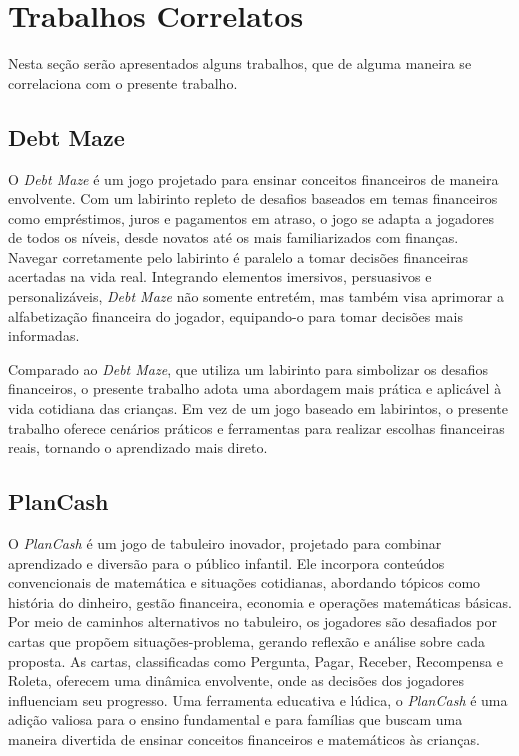     \section{Trabalhos Correlatos}
        Nesta seção serão apresentados alguns trabalhos, que de alguma maneira se correlaciona com o presente trabalho.

        \subsection{Debt Maze}
            O \textit{Debt Maze}\cite{Debt_Maze} é um jogo projetado para ensinar conceitos financeiros de maneira envolvente. Com um labirinto repleto de desafios baseados em temas financeiros como empréstimos, juros e pagamentos em atraso, o jogo se adapta a jogadores de todos os níveis, desde novatos até os mais familiarizados com finanças. Navegar corretamente pelo labirinto é paralelo a tomar decisões financeiras acertadas na vida real. Integrando elementos imersivos, persuasivos e personalizáveis, \textit{Debt Maze}\cite{Debt_Maze} não somente entretém, mas também visa aprimorar a alfabetização financeira do jogador, equipando-o para tomar decisões mais informadas.

            Comparado ao \textit{Debt Maze}\cite{Debt_Maze}, que utiliza um labirinto para simbolizar os desafios financeiros, o presente trabalho adota uma abordagem mais prática e aplicável à vida cotidiana das crianças. Em vez de um jogo baseado em labirintos, o presente trabalho oferece cenários práticos e ferramentas para realizar escolhas financeiras reais, tornando o aprendizado mais direto.

        \subsection{PlanCash}
            O \textit{PlanCash}\cite{mariano2020educaccao} é um jogo de tabuleiro inovador, projetado para combinar aprendizado e diversão para o público infantil. Ele incorpora conteúdos convencionais de matemática e situações cotidianas, abordando tópicos como história do dinheiro, gestão financeira, economia e operações matemáticas básicas. Por meio de caminhos alternativos no tabuleiro, os jogadores são desafiados por cartas que propõem situações-problema, gerando reflexão e análise sobre cada proposta. As cartas, classificadas como Pergunta, Pagar, Receber, Recompensa e Roleta, oferecem uma dinâmica envolvente, onde as decisões dos jogadores influenciam seu progresso. Uma ferramenta educativa e lúdica, o \textit{PlanCash}\cite{mariano2020educaccao} é uma adição valiosa para o ensino fundamental e para famílias que buscam uma maneira divertida de ensinar conceitos financeiros e matemáticos às crianças.

